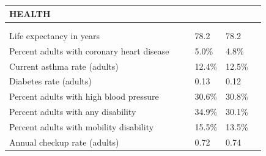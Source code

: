 \documentclass[9pt]{report}
\begin{document}
\newpage
\setlength{\tabcolsep}{.01in} %
\begin{tabular}{p{.10in}p{.10in}p{.10in}p{3.7in}>{\hfill}p{.85in}>{\hfill}p{.85in}>{\hfill}p{.85in}>{\hfill}p{.85in}p{0.1in}}
\multicolumn{9}{l}{\parbox{7.1in}{\raggedright{\large{\strut\textbf{HEALTH}\strut}}}} \\ 
\hline
\multicolumn{4}{l}{\parbox{3.5in}{\raggedright{\textbf{}}}} & \multicolumn{1}{r}{\parbox{.85in}{\strut\raggedleft{\textbf{}\strut}}} & \multicolumn{1}{r}{\parbox{.85in}{\strut\raggedleft{\textbf{}\strut}}} & \multicolumn{1}{r}{\parbox{.85in}{\strut{}}} & \multicolumn{1}{r}{\parbox{.85in}{\strut{}}} & \\ 
\multicolumn{9}{l}{} \\ 
\multicolumn{4}{l}{\parbox{3.6in}{\strut\raggedright{{Life expectancy in years}}\strut}} &  &  & 78.2 & 78.2 & \multicolumn{1}{l}{}  \\ 
\multicolumn{4}{l}{\parbox{3.6in}{\strut\raggedright{{Percent adults with coronary heart disease}}\strut}} &  &  & 5.0\% & 4.8\% & \multicolumn{1}{l}{}  \\ 
\multicolumn{4}{l}{\parbox{3.6in}{\strut\raggedright{{Current asthma rate (adults)}}\strut}} &  &  & 12.4\% & 12.5\% & \multicolumn{1}{l}{}  \\ 
\multicolumn{4}{l}{\parbox{3.6in}{\strut\raggedright{{Diabetes rate (adults)}}\strut}} &  &  & 0.13 & 0.12 & \multicolumn{1}{l}{}  \\ 
\multicolumn{4}{l}{\parbox{3.6in}{\strut\raggedright{{Percent adults with high blood pressure}}\strut}} &  &  & 30.6\% & 30.8\% & \multicolumn{1}{l}{}  \\ 
\multicolumn{4}{l}{\parbox{3.6in}{\strut\raggedright{{Percent adults with any disability}}\strut}} &  &  & 34.9\% & 30.1\% & \multicolumn{1}{l}{}  \\ 
\multicolumn{4}{l}{\parbox{3.6in}{\strut\raggedright{{Percent adults with mobility disability}}\strut}} &  &  & 15.5\% & 13.5\% & \multicolumn{1}{l}{}  \\ 
\multicolumn{4}{l}{\parbox{3.6in}{\strut\raggedright{{Annual checkup rate (adults)}}\strut}} &  &  & 0.72 & 0.74 & \multicolumn{1}{l}{}  \\ 

\end{tabular}
\end{document}
